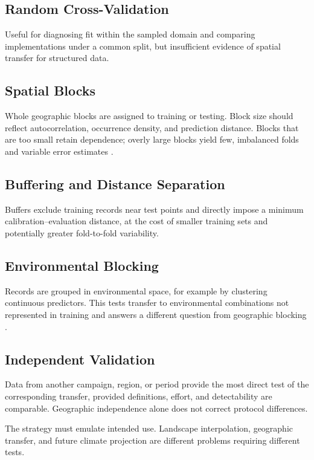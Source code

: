 \subsection{Random Cross-Validation}
Useful for diagnosing fit within the sampled domain and comparing implementations
under a common split, but insufficient evidence of spatial transfer for
structured data.

\subsection{Spatial Blocks}
Whole geographic blocks are assigned to training or testing. Block size should
reflect autocorrelation, occurrence density, and prediction distance. Blocks
that are too small retain dependence; overly large blocks yield few,
imbalanced folds and variable error estimates
\parencite{roberts2017crossvalidation,valavi2019blockcv}.

\subsection{Buffering and Distance Separation}
Buffers exclude training records near test points and directly impose a minimum
calibration--evaluation distance, at the cost of smaller training sets and
potentially greater fold-to-fold variability.

\subsection{Environmental Blocking}
Records are grouped in environmental space, for example by clustering continuous
predictors. This tests transfer to environmental combinations not represented in
training and answers a different question from geographic blocking
\parencite{valavi2019blockcv}.

\subsection{Independent Validation}
Data from another campaign, region, or period provide the most direct test of
the corresponding transfer, provided definitions, effort, and detectability are
comparable. Geographic independence alone does not correct protocol differences.

\begin{atencao}[title={\faExclamationTriangle\quad No partition is universally best}]
The strategy must emulate intended use. Landscape interpolation, geographic
transfer, and future climate projection are different problems requiring
different tests.
\end{atencao}

